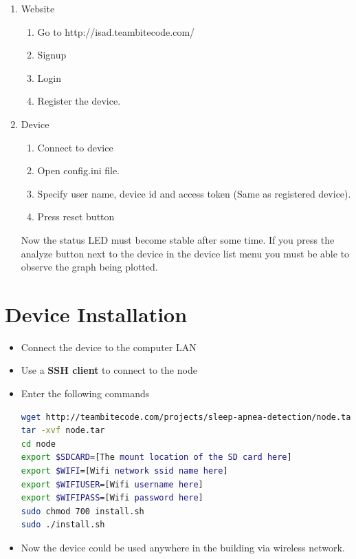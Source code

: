 \documentclass{report}
\begin{document}
\begin{enumerate}

  \item Website 
    \begin{enumerate}
      \item Go to http://isad.teambitecode.com/
      \item Signup
      \item Login
      \item Register the device.
    \end{enumerate}

  \item Device
    \begin{enumerate}
      \item Connect to device
      \item Open config.ini file.
      \item Specify user name, device id and access token (Same as registered device).
      \item Press reset button
    \end{enumerate}
    
Now the status LED must become stable after some time. If you press the analyze button next to the device in the device list menu you must be able to observe the graph being plotted.
  
\end{enumerate}


\section{Device Installation}
\begin{itemize}
    \item Connect the device to the computer LAN
    \item Use a \textbf{SSH client} to connect to the node
    \item Enter the following commands\\
\begin{lstlisting}[language=bash]
wget http://teambitecode.com/projects/sleep-apnea-detection/node.tar
tar -xvf node.tar
cd node
export $SDCARD=[The mount location of the SD card here]
export $WIFI=[Wifi network ssid name here]
export $WIFIUSER=[Wifi username here]
export $WIFIPASS=[Wifi password here]
sudo chmod 700 install.sh
sudo ./install.sh
\end{lstlisting}
    \item Now the device could be used anywhere in the building via wireless network.
\end{itemize}
\end{document}
